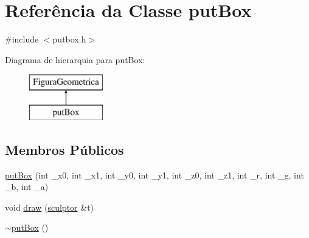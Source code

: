 \hypertarget{classput_box}{}\section{Referência da Classe put\+Box}
\label{classput_box}


{\ttfamily \#include $<$putbox.\+h$>$}

Diagrama de hierarquia para put\+Box\+:\begin{figure}[H]
\begin{center}
\leavevmode
\includegraphics[height=2.000000cm]{classput_box}
\end{center}
\end{figure}
\subsection*{Membros Públicos}
\begin{DoxyCompactItemize}
\item 
\mbox{\hyperlink{classput_box_a0681d6bc86d73945045d3bc8fe31ca9c}{put\+Box}} (int \+\_\+x0, int \+\_\+x1, int \+\_\+y0, int \+\_\+y1, int \+\_\+z0, int \+\_\+z1, int \+\_\+r, int \+\_\+g, int \+\_\+b, int \+\_\+a)
\item 
void \mbox{\hyperlink{classput_box_ae472342f54d086fd05be3d1e321e1ec7}{draw}} (\mbox{\hyperlink{classsculptor}{sculptor}} \&t)
\item 
\mbox{\hyperlink{classput_box_aa8bddb88c536421ee9ee7aec7e73a060}{$\sim$put\+Box}} ()
\end{DoxyCompactItemize}
